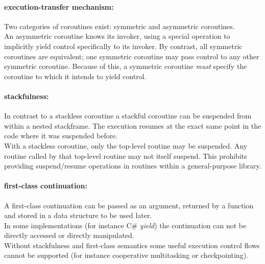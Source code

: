 \paragraph*{execution-transfer mechanism:}
Two categories of coroutines exist: symmetric and asymmetric coroutines.\\
\newline
An asymmetric coroutine knows its invoker, using a special operation to
implicitly yield control specifically to its invoker. By contrast, all symmetric
coroutines are equivalent; one symmetric coroutine may pass control to any
other symmetric coroutine. Because of this, a symmetric coroutine \textit{must}
specify the coroutine to which it intends to yield control.

\paragraph*{stackfulness:}
In contrast to a stackless coroutine a stackful coroutine can be suspended
from within a nested stackframe. The execution resumes at the exact same point
in the code where it was suspended before.\\
With a stackless coroutine, only the top-level routine may be suspended. Any
routine called by that top-level routine may not itself suspend. This prohibits
providing suspend/resume operations in routines within a general-purpose library.

\paragraph*{first-class continuation:}
A first-class continuation can be passed as an argument, returned by a
function and stored in a data structure to be used later.\\
In some implementations (for instance C\# \textit{yield}) the continuation can
not be directly accessed or directly manipulated.\\
\newline
Without stackfulness and first-class semantics some useful execution control
flows cannot be supported (for instance cooperative multitasking or
checkpointing).

